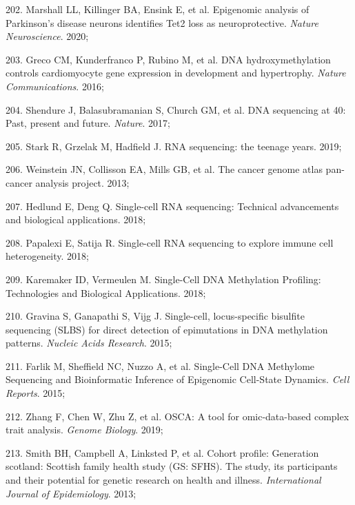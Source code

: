 \documentclass[11pt,oneside]{bristolthesis}
\newenvironment{cslreferences}%
  {}%
  {\par}
\begin{document}
\begin{cslreferences}
\leavevmode\hypertarget{ref-Marshall2020}{}%
202. Marshall LL, Killinger BA, Ensink E, et al. Epigenomic analysis of Parkinson's disease neurons identifies Tet2 loss as neuroprotective. \emph{Nature Neuroscience}. 2020;

\leavevmode\hypertarget{ref-Greco2016}{}%
203. Greco CM, Kunderfranco P, Rubino M, et al. DNA hydroxymethylation controls cardiomyocyte gene expression in development and hypertrophy. \emph{Nature Communications}. 2016;

\leavevmode\hypertarget{ref-Shendure2017}{}%
204. Shendure J, Balasubramanian S, Church GM, et al. DNA sequencing at 40: Past, present and future. \emph{Nature}. 2017;

\leavevmode\hypertarget{ref-Stark2019}{}%
205. Stark R, Grzelak M, Hadfield J. RNA sequencing: the teenage years. 2019;

\leavevmode\hypertarget{ref-Weinstein2013}{}%
206. Weinstein JN, Collisson EA, Mills GB, et al. The cancer genome atlas pan-cancer analysis project. 2013;

\leavevmode\hypertarget{ref-Hedlund2018}{}%
207. Hedlund E, Deng Q. Single-cell RNA sequencing: Technical advancements and biological applications. 2018;

\leavevmode\hypertarget{ref-Papalexi2018}{}%
208. Papalexi E, Satija R. Single-cell RNA sequencing to explore immune cell heterogeneity. 2018;

\leavevmode\hypertarget{ref-Karemaker2018}{}%
209. Karemaker ID, Vermeulen M. Single-Cell DNA Methylation Profiling: Technologies and Biological Applications. 2018;

\leavevmode\hypertarget{ref-Gravina2015}{}%
210. Gravina S, Ganapathi S, Vijg J. Single-cell, locus-specific bisulfite sequencing (SLBS) for direct detection of epimutations in DNA methylation patterns. \emph{Nucleic Acids Research}. 2015;

\leavevmode\hypertarget{ref-Farlik2015}{}%
211. Farlik M, Sheffield NC, Nuzzo A, et al. Single-Cell DNA Methylome Sequencing and Bioinformatic Inference of Epigenomic Cell-State Dynamics. \emph{Cell Reports}. 2015;

\leavevmode\hypertarget{ref-Zhang2019}{}%
212. Zhang F, Chen W, Zhu Z, et al. OSCA: A tool for omic-data-based complex trait analysis. \emph{Genome Biology}. 2019;

\leavevmode\hypertarget{ref-Smith2013}{}%
213. Smith BH, Campbell A, Linksted P, et al. Cohort profile: Generation scotland: Scottish family health study (GS: SFHS). The study, its participants and their potential for genetic research on health and illness. \emph{International Journal of Epidemiology}. 2013;


\end{cslreferences}
\end{document}

